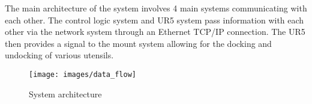 The main architecture of the system involves 4 main systems communicating with each other. The control logic system and UR5 system pass information with each other via the network system through an Ethernet TCP/IP connection.  The UR5 then provides a signal to the mount system allowing for the docking and undocking of various utensils.

\begin{figure}[h!]
	\centering
 	\texttt{[image: images/data\_flow]}
 \caption{System architecture}
\end{figure}
